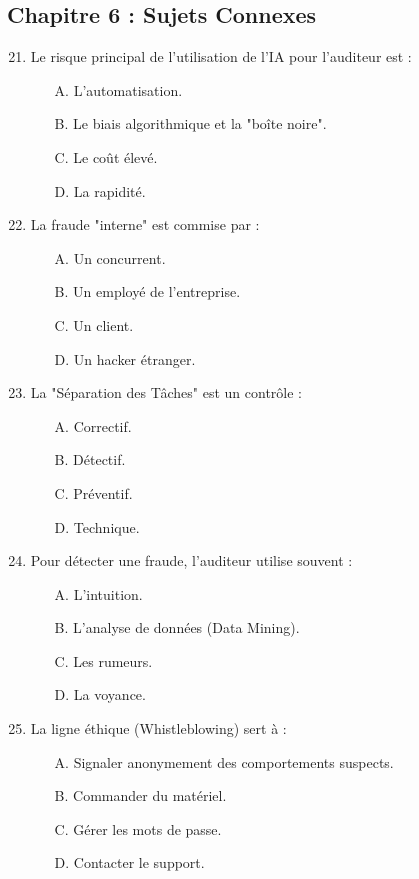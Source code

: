 \subsection*{Chapitre 6 : Sujets Connexes}
\begin{enumerate}
    \setcounter{enumi}{20}
    \item Le risque principal de l'utilisation de l'IA pour l'auditeur est :
    \begin{itemize} \item[A.] L'automatisation. \item[B.] Le biais algorithmique et la "boîte noire". \item[C.] Le coût élevé. \item[D.] La rapidité. \end{itemize}
    \item La fraude "interne" est commise par :
    \begin{itemize} \item[A.] Un concurrent. \item[B.] Un employé de l'entreprise. \item[C.] Un client. \item[D.] Un hacker étranger. \end{itemize}
    \item La "Séparation des Tâches" est un contrôle :
    \begin{itemize} \item[A.] Correctif. \item[B.] Détectif. \item[C.] Préventif. \item[D.] Technique. \end{itemize}
    \item Pour détecter une fraude, l'auditeur utilise souvent :
    \begin{itemize} \item[A.] L'intuition. \item[B.] L'analyse de données (Data Mining). \item[C.] Les rumeurs. \item[D.] La voyance. \end{itemize}
    \item La ligne éthique (Whistleblowing) sert à :
    \begin{itemize} \item[A.] Signaler anonymement des comportements suspects. \item[B.] Commander du matériel. \item[C.] Gérer les mots de passe. \item[D.] Contacter le support. \end{itemize}
\end{enumerate}

